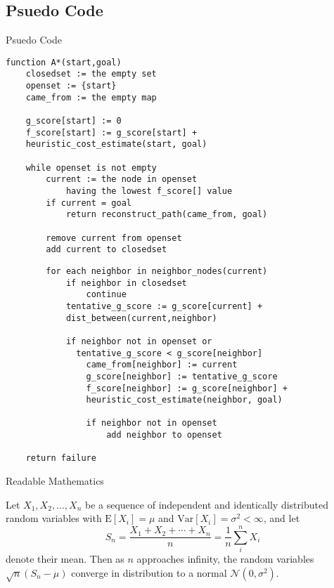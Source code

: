 \documentclass{beamer}
\begin{document}
\subsection{Psuedo Code}
\begin{frame}[fragile]{Psuedo Code}
\begin{verbatim}
function A*(start,goal)
    closedset := the empty set   
    openset := {start}   
    came_from := the empty map 
 
    g_score[start] := 0 
    f_score[start] := g_score[start] + 
    heuristic_cost_estimate(start, goal)
 
    while openset is not empty
        current := the node in openset 
            having the lowest f_score[] value
        if current = goal
            return reconstruct_path(came_from, goal)
 
        remove current from openset
        add current to closedset
\end{verbatim}
\end{frame}

\begin{frame}[fragile]
\begin{verbatim}
        for each neighbor in neighbor_nodes(current)
            if neighbor in closedset
                continue
            tentative_g_score := g_score[current] + 
            dist_between(current,neighbor)
 
            if neighbor not in openset or 
              tentative_g_score < g_score[neighbor] 
                came_from[neighbor] := current
                g_score[neighbor] := tentative_g_score
                f_score[neighbor] := g_score[neighbor] + 
                heuristic_cost_estimate(neighbor, goal)
                
                if neighbor not in openset
                    add neighbor to openset
 
    return failure
\end{verbatim}
\end{frame}
\begin{frame}{Readable Mathematics}

Let $X_1, X_2, \ldots, X_n$ be a sequence of independent and identically distributed random variables with $\text{E}[X_i] = \mu$ and $\text{Var}[X_i] = \sigma^2 < \infty$, and let
$$S_n = \frac{X_1 + X_2 + \cdots + X_n}{n}
      = \frac{1}{n}\sum_{i}^{n} X_i$$
denote their mean. Then as $n$ approaches infinity, the random variables $\sqrt{n}(S_n - \mu)$ converge in distribution to a normal $\mathcal{N}(0, \sigma^2)$.

\end{frame}
\end{document}
